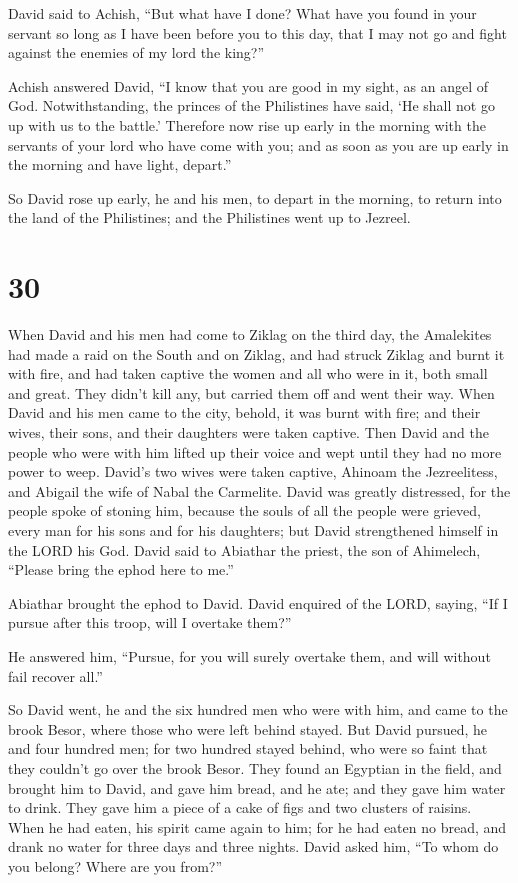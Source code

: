  David said to Achish, ``But what have I done? What have you
found in your servant so long as I have been before you to this day,
that I may not go and fight against the enemies of my lord the king?''

 Achish answered David, ``I know that you are good in my
sight, as an angel of God. Notwithstanding, the princes of the
Philistines have said, `He shall not go up with us to the battle.'
 Therefore now rise up early in the morning with the
servants of your lord who have come with you; and as soon as you are up
early in the morning and have light, depart.''

 So David rose up early, he and his men, to depart in the
morning, to return into the land of the Philistines; and the Philistines
went up to Jezreel.

\hypertarget{section-29}{%
\section{30}\label{section-29}}

 When David and his men had come to Ziklag on the third day,
the Amalekites had made a raid on the South and on Ziklag, and had
struck Ziklag and burnt it with fire,  and had taken captive
the women and all who were in it, both small and great. They didn't kill
any, but carried them off and went their way.  When David
and his men came to the city, behold, it was burnt with fire; and their
wives, their sons, and their daughters were taken captive. 
Then David and the people who were with him lifted up their voice and
wept until they had no more power to weep.  David's two
wives were taken captive, Ahinoam the Jezreelitess, and Abigail the wife
of Nabal the Carmelite.  David was greatly distressed, for
the people spoke of stoning him, because the souls of all the people
were grieved, every man for his sons and for his daughters; but David
strengthened himself in the LORD his God.  David said to
Abiathar the priest, the son of Ahimelech, ``Please bring the ephod here
to me.''

Abiathar brought the ephod to David.  David enquired of the
LORD, saying, ``If I pursue after this troop, will I overtake them?''

He answered him, ``Pursue, for you will surely overtake them, and will
without fail recover all.''

 So David went, he and the six hundred men who were with
him, and came to the brook Besor, where those who were left behind
stayed.  But David pursued, he and four hundred men; for
two hundred stayed behind, who were so faint that they couldn't go over
the brook Besor.  They found an Egyptian in the field, and
brought him to David, and gave him bread, and he ate; and they gave him
water to drink.  They gave him a piece of a cake of figs
and two clusters of raisins. When he had eaten, his spirit came again to
him; for he had eaten no bread, and drank no water for three days and
three nights.  David asked him, ``To whom do you belong?
Where are you from?''

